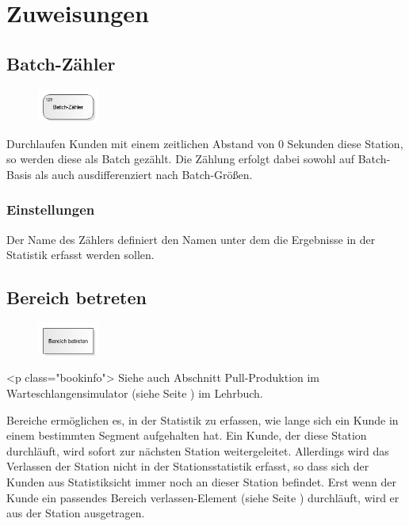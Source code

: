 \chapter{Zuweisungen}

\section{Batch-Zähler}
\label{ref:ModelElementCounterBatch}

\begin{figure}
\vspace{-22pt}
\includegraphics[width=2cm]{imageModelElementCounterBatch.png}
\vspace{-22pt}
\end{figure}

Durchlaufen Kunden mit einem zeitlichen Abstand von 0 Sekunden diese Station, so werden diese
als Batch gezählt. Die Zählung erfolgt dabei sowohl auf Batch-Basis als auch ausdifferenziert
nach Batch-Größen.

\subsection*{Einstellungen}

Der Name des Zählers definiert den Namen unter dem die Ergebnisse in der Statistik erfasst werden sollen.


\section{Bereich betreten}
\label{ref:ModelElementSectionStart}

\begin{figure}
\vspace{-22pt}
\includegraphics[width=2cm]{imageModelElementSectionStart.png}
\vspace{-22pt}
\end{figure}

<p class="bookinfo">
Siehe auch Abschnitt Pull-Produktion im Warteschlangensimulator (siehe Seite \pageref{ref:book:7.6.3}) im Lehrbuch.

Bereiche ermöglichen es, in der Statistik zu erfassen, wie lange sich ein Kunde in einem bestimmten
Segment aufgehalten hat. Ein Kunde, der diese Station durchläuft, wird sofort zur nächsten Station
weitergeleitet. Allerdings wird das Verlassen der Station nicht in der Stationsstatistik erfasst,
so dass sich der Kunden aus Statistiksicht immer noch an dieser Station befindet. Erst wenn der
Kunde ein passendes Bereich verlassen-Element (siehe Seite \pageref{ref:ModelElementSectionEnd}) durchläuft,
wird er aus der Station ausgetragen.

